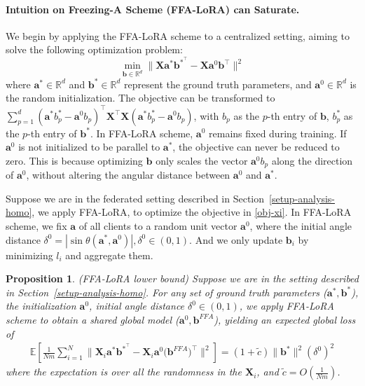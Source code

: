 \documentclass{article}
\theoremstyle{plain}
\newtheorem{proposition}[theorem]{Proposition}
\theoremstyle{definition}
\theoremstyle{remark}
\begin{document}
\paragraph{Intuition on Freezing-A Scheme (FFA-LoRA) can Saturate.}
We begin by applying the FFA-LoRA scheme to a centralized setting, aiming to solve the following optimization problem:
\[
    \min_{\mathbf{b} \in \mathbb{R}^d} \lVert \mathbf{X}\mathbf{a}^*\mathbf{b}^{*^\top}-\mathbf{X}\mathbf{a}^{0} \mathbf{b}^\top \rVert^2 
\]
where $\mathbf{a}^* \in \mathbb{R}^d$ and $\mathbf{b}^* \in \mathbb{R}^d$ represent the ground truth parameters, and $\mathbf{a}^0 \in \mathbb{R}^d$ is the random initialization. The objective can be transformed to $\sum_{p=1}^{d}(\mathbf{a}^*{b}^{*}_p-\mathbf{a}^{0} {b}_p)^\top \mathbf{X}^\top \mathbf{X}(\mathbf{a}^*{b}^{*}_p-\mathbf{a}^{0} {b}_p)$, with ${b}_p$ as the $p$-th entry of $\mathbf{b}$, ${b}_p^*$ as the $p$-th entry of $\mathbf{b}^*$. In FFA-LoRA scheme, $\mathbf{a}^0$ remains fixed during training. If $\mathbf{a}^0$ is not initialized to be parallel to $\mathbf{a}^*$, the objective can never be reduced to zero. This is because optimizing $\mathbf{b}$ only scales the vector $\mathbf{a}^{0} b_p$ along the direction of $\mathbf{a}^{0}$, without altering the angular distance between $\mathbf{a}^{0}$ and $\mathbf{a}^*$.

Suppose we are in the federated setting described in Section~\ref{setup-analysis-homo}, we apply FFA-LoRA, to optimize the objective in \eqref{obj-xi}. In FFA-LoRA scheme, we fix $\mathbf{a}$ of all clients to a random unit vector $\mathbf{a}^0$, where the initial angle distance $\delta^0 = |\sin \theta ( \mathbf{a}^*, \mathbf{a}^0)|, \delta^0\in (0,1)$. And we only update $\mathbf{b}_i$ by minimizing $l_i$ and aggregate them.  
\begin{proposition} \label{fa-saturate-homo}(FFA-LoRA lower bound)
Suppose we are in the setting described in Section~\ref{setup-analysis-homo}. For any set of ground truth parameters ($\mathbf{a}^*,\mathbf{b}^*$), the initialization $\mathbf{a}^0$, initial angle distance $\delta^0\in (0,1)$, we apply FFA-LoRA scheme to obtain a shared global model ($\mathbf{a}^0,{\mathbf{b}}^{FFA}$), yielding an expected global loss of 
\begin{align}
    \mathbb{E}[\frac{1}{Nm}\sum_{i=1}^N\lVert  \mathbf{X}_i\mathbf{a}^*\mathbf{b}^{*^\top}- \mathbf{X}_i\mathbf{a}^0({{\mathbf{b}}^{FFA})^\top}\rVert^2] = (1+\tilde{c})\| \mathbf{b}^*\|^2(\delta^0)^2 \label{loss-ffa}
\end{align}
where the expectation is over all the randomness in the $\mathbf{X}_i$, and $\tilde{c}=O(\frac{1}{Nm})$.
\end{proposition}
\end{document}
